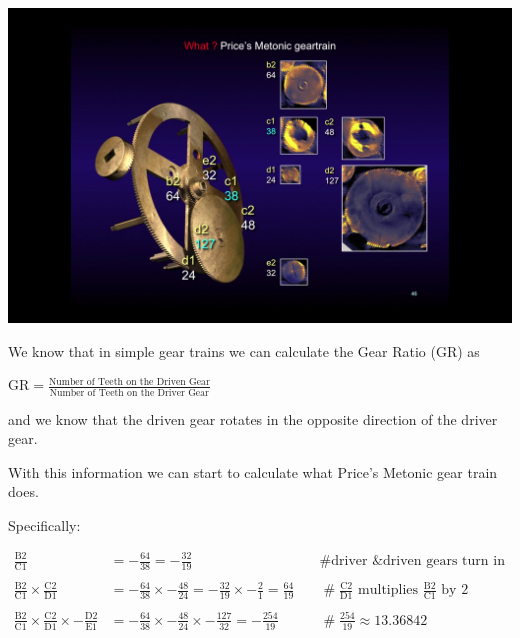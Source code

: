 \documentclass[11pt, oneside]{article}   	%
\theoremstyle{definition}
\begin{document}
\begin{minipage}[c]{0.5\textwidth}
  \includegraphics[width=\textwidth,cfbox=red]{images/price_metonic_gear_train.png}
\end{minipage}

\noindent
We know that in simple gear trains we can calculate the Gear Ratio (GR) as 

\bigskip
\begin{center}
{\Large $\text{GR} = \frac{\text{Number of Teeth on the Driven Gear}}{\text{Number of Teeth on the Driver Gear}}$}
\end{center}

\bigskip
\noindent
and we know that the driven gear rotates in the opposite direction of the driver gear. 


\bigskip
\noindent
With this information we can start to calculate what Price's Metonic gear train does. 

\bigskip
\noindent
Specifically:

\begin{equation*}
\begin{array}{lllll}
\frac{\text{B2}}{\text{C1}} &= - \frac{64}{38} = - \frac{32}{19} & \quad \mathrel{\#} \text{driver \& driven gears turn in opposite directions} \\ \\
\frac{\text{B2}}{\text{C1}} \times \frac{\text{C2}}{\text{D1}} &= - \frac{64}{38} \times - \frac{48}{24} = - \frac{32}{19} \times - \frac{2}{1} = \frac{64}{19} 
& \quad \mathrel{\#} \frac{\text{C2}}{\text{D1}} \text{ multiplies $\frac{\text{B2}}{\text{C1}}$ by $2$}                       \\ \\
\frac{\text{B2}}{\text{C1}} \times \frac{\text{C2}}{\text{D1}} \times - \frac{\text{D2}}{\text{E1}} &= - \frac{64}{38} \times - \frac{48}{24} \times - \frac{127}{32} 
=  -\frac{254}{19} & \quad \mathrel{\#} \frac{254}{19} \approx 13.36842
\end{array}
\end{equation*}
\end{document}
